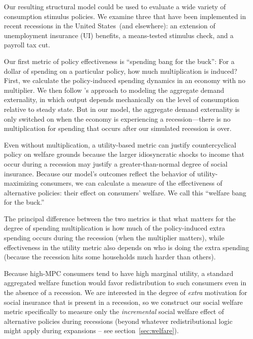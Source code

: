 \documentclass[\econtexRoot/HAFiscal]{subfiles}
\begin{document}
Our resulting structural model could be used to evaluate a wide variety of consumption stimulus policies.  We examine three that have been implemented in recent recessions in the United States\ (and elsewhere): an extension of unemployment insurance (UI) benefits, a means-tested stimulus check, and a payroll tax cut.    

Our first metric of policy effectiveness is ``spending bang for the buck'': For a dollar of spending on a particular policy, how much multiplication is induced?  %
First, we calculate the policy-induced spending dynamics in an economy with no multiplier.  We then follow \cite{kmpHandbook2016}'s approach to modeling the aggregate demand externality, in which output depends mechanically on the level of consumption relative to steady state. But in our model, the aggregate demand externality is only switched on when the economy is experiencing a recession---there is no multiplication for spending that occurs after our simulated recession is over.  %

Even without multiplication, a utility-based metric can justify countercyclical policy on welfare grounds because the larger idiosyncratic shocks to income that occur during a recession may justify a greater-than-normal degree of social insurance.  Because our model's outcomes reflect the behavior of utility-maximizing consumers, we can calculate a measure of the effectiveness of alternative policies:  their effect on consumers' welfare.  We call this ``welfare bang for the buck.''  

The principal difference between the two metrics is that what matters for the degree of spending multiplication is how much of the policy-induced extra spending occurs during the recession (when the multiplier matters), while effectiveness in the utility metric also depends on who is doing the extra spending (because the recession hits some households much harder than others).

Because high-MPC consumers tend to have high marginal utility, a standard aggregated welfare function would favor redistribution to such consumers even in the absence of a recession. We are interested in the degree of \textit{extra} motivation for social insurance that is present in a recession, so we construct our social welfare metric specifically to measure only the \textit{incremental} social welfare effect of alternative policies during recessions (beyond whatever redistributional logic might apply during expansions -- see section~\ref{sec:welfare}).
\end{document}
